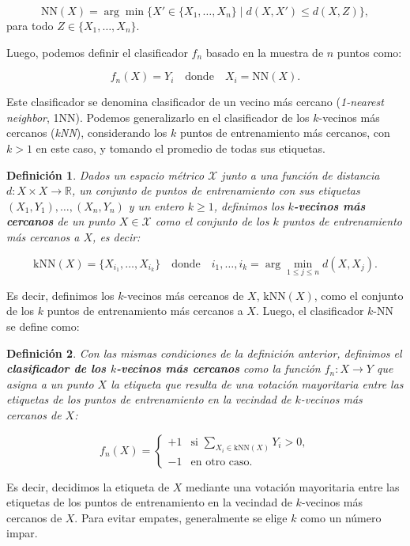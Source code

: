 \documentclass{report}
\newtheorem{dfn}{Definición}[section]
\begin{document}
\[
\text{NN}(X) = \arg\min \{X' \in \{X_1, \dots, X_n\} \mid d(X, X') \leq d(X, Z)\},
\]
para todo \( Z \in \{X_1, \dots, X_n\} \).

Luego, podemos definir el clasificador \(f_n\) basado en la muestra de \(n\) puntos como:

\[
f_n(X) = Y_i \quad \text{donde} \quad X_i = \text{NN}(X).
\]

Este clasificador se denomina clasificador de un vecino más cercano (\textit{1-nearest neighbor}, 1NN).
Podemos generalizarlo en el clasificador de los \(k\)-vecinos más cercanos (\textit{kNN}), considerando los \(k\) puntos de
entrenamiento más cercanos, con $k>1$ en este caso, y tomando el promedio de todas sus etiquetas.


\begin{dfn}
    Dados un espacio métrico \(\mathcal{X}\) junto a una función de distancia \(d : X \times X \to \mathbb{R}\),
    un conjunto de puntos de entrenamiento con sus etiquetas \((X_1, Y_1), \dots, (X_n, Y_n)\) y un entero \(k \geq 1\),
    definimos los \textbf{\(k\)-vecinos más cercanos} de un punto \(X \in \mathcal{X} \) como el conjunto de los \(k\) puntos
    de entrenamiento más cercanos a \(X\), es decir:

    \[
    \text{kNN}(X) = \{X_{i_1}, \dots, X_{i_k}\} \quad \text{donde} \quad i_1, \dots, i_k = \arg\min_{1 \leq j \leq n} d(X, X_j).
    \]
\end{dfn}

Es decir, definimos los
\(k\)-vecinos más cercanos de \(X\), \(\text{kNN}(X)\), como el conjunto de los \(k\) puntos de
entrenamiento más cercanos a \(X\). Luego, el clasificador \(k\)-NN se define como:

\begin{dfn}
    Con las mismas condiciones de la definición anterior,
    definimos el \textbf{clasificador de los \(k\)-vecinos más cercanos} como la función \(f_n : X \to Y\)
    que asigna a un punto \(X\) la etiqueta que resulta de una votación mayoritaria entre las etiquetas
    de los puntos de entrenamiento en la vecindad de \(k\)-vecinos más cercanos de \(X\):


    \[
f_n(X) =
\begin{cases}
+1 & \text{si } \underset{{X_i \in \text{kNN}(X)}}{\sum}Y_i > 0, \\
-1 & \text{en otro caso}.
\end{cases}
\]
\end{dfn}


Es decir, decidimos la etiqueta de \(X\) mediante una votación mayoritaria entre las etiquetas de los
puntos de entrenamiento en la vecindad de \(k\)-vecinos más cercanos de \(X\). Para evitar empates,
generalmente se elige \(k\) como un número impar.
\end{document}
